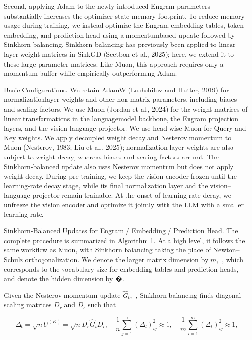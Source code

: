 \documentclass[
  10
]{article}
\begin{document}
Second, applying Adam to the newly introduced Engram parameters
substantially increases the optimizer-state memory footprint. To reduce
memory usage during training, we instead optimize the Engram embedding
tables, token embedding, and prediction head using a momentumbased
update followed by Sinkhorn balancing. Sinkhorn balancing has previously
been applied to linear-layer weight matrices in SinkGD (Scetbon et al.,
2025); here, we extend it to these large parameter matrices. Like Muon,
this approach requires only a momentum buffer while empirically
outperforming Adam.

Basic Configurations. We retain AdamW (Loshchilov and Hutter, 2019) for
normalizationlayer weights and other non-matrix parameters, including
biases and scaling factors. We use Muon (Jordan et al., 2024) for the
weight matrices of linear transformations in the languagemodel backbone,
the Engram projection layers, and the vision-language projector. We use
head-wise Muon for Query and Key weights. We apply decoupled weight
decay and Nesterov momentum to Muon (Nesterov, 1983; Liu et al., 2025);
normalization-layer weights are also subject to weight decay, whereas
biases and scaling factors are not. The Sinkhorn-balanced update also
uses Nesterov momentum but does not apply weight decay. During
pre-training, we keep the vision encoder frozen until the learning-rate
decay stage, while its final normalization layer and the
vision--language projector remain trainable. At the onset of
learning-rate decay, we unfreeze the vision encoder and optimize it
jointly with the LLM with a smaller learning rate.

Sinkhorn-Balanced Updates for Engram / Embedding / Prediction Head. The
complete procedure is summarized in Algorithm 1. At a high level, it
follows the same workflow as Muon, with Sinkhorn balancing taking the
place of Newton--Schulz orthogonalization. We denote the larger matrix
dimension by \(m ,\) , which corresponds to the vocabulary size for
embedding tables and prediction heads, and denote the hidden dimension
by �.

Given the Nesterov momentum update \(\widehat { G } _ { t } ,\) ,
Sinkhorn balancing finds diagonal scaling matrices \(D _ { r }\) and
\(D _ { c }\) such that

\[
\Delta_ {t} = \sqrt {n} U ^ {(K)} = \sqrt {n} D _ {r} \widehat {G} _ {t} D _ {c}, \quad \frac {1}{n} \sum_ {j = 1} ^ {n} (\Delta_ {t}) _ {i j} ^ {2} \approx 1, \quad \frac {1}{m} \sum_ {i = 1} ^ {m} (\Delta_ {t}) _ {i j} ^ {2} \approx 1,\tag{7}
\]
\end{document}
